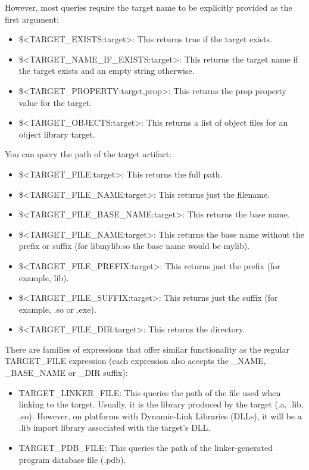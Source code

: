 However, most queries require the target name to be explicitly provided as the first argument:

\begin{itemize}
\item
\$<TARGET\_EXISTS:target>: This returns true if the target exists.

\item
\$<TARGET\_NAME\_IF\_EXISTS:target>: This returns the target name if the target exists and an empty string otherwise.

\item
\$<TARGET\_PROPERTY:target,prop>: This returns the prop property value for the target.

\item
\$<TARGET\_OBJECTS:target>: This returns a list of object files for an object library target.
\end{itemize}

You can query the path of the target artifact:

\begin{itemize}
\item
\$<TARGET\_FILE:target>: This returns the full path.

\item
\$<TARGET\_FILE\_NAME:target>: This returns just the filename.

\item
\$<TARGET\_FILE\_BASE\_NAME:target>: This returns the base name.

\item
\$<TARGET\_FILE\_NAME:target>: This returns the base name without the prefix or suffix (for libmylib.so the base name would be mylib).

\item
\$<TARGET\_FILE\_PREFIX:target>: This returns just the prefix (for example, lib).

\item
\$<TARGET\_FILE\_SUFFIX:target>: This returns just the suffix (for example, .so or .exe).

\item
\$<TARGET\_FILE\_DIR:target>: This returns the directory.
\end{itemize}

There are families of expressions that offer similar functionality as the regular TARGET\_FILE expression (each expression also accepts the \_NAME, \_BASE\_NAME or \_DIR suffix):

\begin{itemize}
\item
TARGET\_LINKER\_FILE: This queries the path of the file used when linking to the target. Usually, it is the library produced by the target (.a, .lib, .so). However, on platforms with Dynamic-Link Libraries (DLLs), it will be a .lib import library associated with the target’s DLL.

\item
TARGET\_PDB\_FILE: This queries the path of the linker-generated program database file (.pdb).
\end{itemize}

